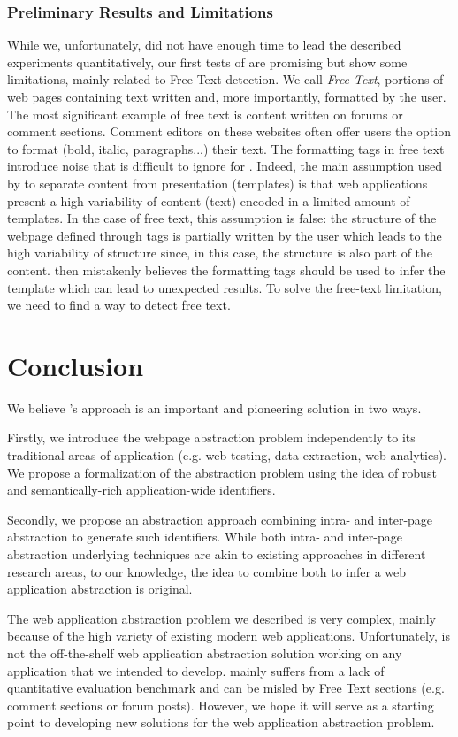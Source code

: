 \subsubsection{Preliminary Results and Limitations}
While we, unfortunately, did not have enough time to lead the described experiments quantitatively, our first tests of \appstract{} are promising but show some limitations, mainly related to Free Text detection.
We call \textit{Free Text}, portions of web pages containing text written and, more importantly, formatted by the user. The most significant example of free text is content written on forums or comment sections.  Comment editors on these websites often offer users the option to format (bold, italic, paragraphs...) their text. The formatting tags in free text introduce noise that is difficult to ignore for \appstract{}. Indeed, the main assumption used by \appstract{} to separate content from presentation (templates) is that web applications present a high variability of content (text) encoded in a limited amount of templates. In the case of free text, this assumption is false: the structure of the webpage defined through tags is partially written by the user which leads to the high variability of structure since, in this case, the structure is also part of the content. \appstract{} then mistakenly believes the formatting tags should be used to infer the template which can lead to unexpected results.
To solve the free-text limitation, we need to find a way to detect free text.

\section{Conclusion}\label{appstract:sec:conclusion}
We believe \appstract{}'s approach is an important and pioneering solution in two ways.

Firstly, we introduce the webpage abstraction problem independently to its traditional areas of application (e.g. web testing, data extraction, web analytics). We propose a formalization of the abstraction problem using the idea of robust and semantically-rich application-wide identifiers.

Secondly, we propose an abstraction approach combining intra- and inter-page abstraction to generate such identifiers. While both intra- and inter-page abstraction underlying techniques are akin to existing approaches in different research areas, to our knowledge, the idea to combine both to infer a web application abstraction is original.

The web application abstraction problem we described is very complex, mainly because of the high variety of existing modern web applications. Unfortunately, \appstract{} is not the off-the-shelf web application abstraction solution working on any application that we intended to develop. \appstract{} mainly suffers from a lack of quantitative evaluation benchmark and can be misled by Free Text sections (e.g. comment sections or forum posts). However, we hope it will serve as a starting point to developing new solutions for the web application abstraction problem.
